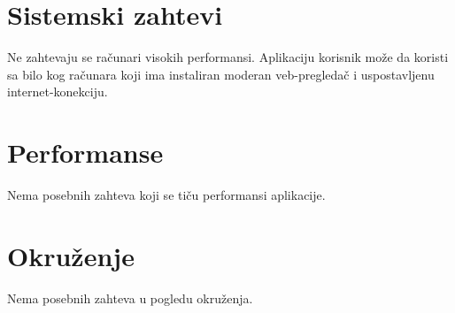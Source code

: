 \section{Sistemski zahtevi}
Ne zahtevaju se računari visokih performansi. Aplikaciju korisnik može da koristi sa bilo kog računara koji ima instaliran moderan veb-pregledač i uspostavljenu internet-konekciju.

\section{Performanse}
Nema posebnih zahteva koji se tiču performansi aplikacije.

\section{Okruženje}
Nema posebnih zahteva u pogledu okruženja.
